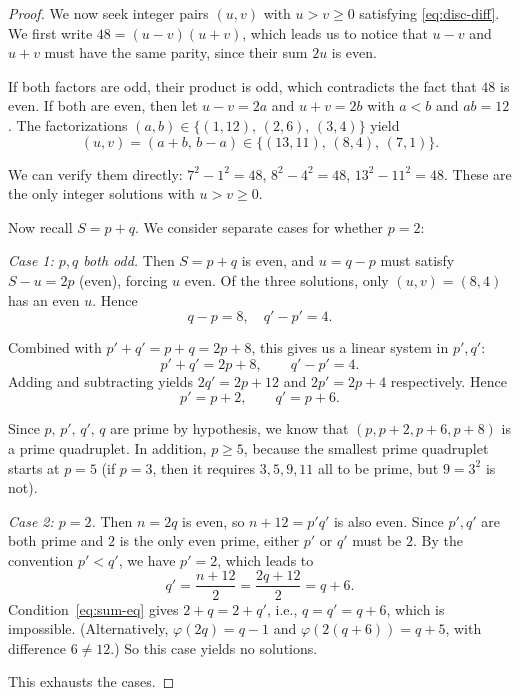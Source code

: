 \documentclass[10pt,a4paper]{amsart}
\begin{document}
\begin{proof}
We now seek integer pairs $(u, v)$ with $u > v \ge 0$ satisfying \eqref{eq:disc-diff}. We first write $48 = (u-v)(u+v)$, which leads us to notice that $u-v$ and $u+v$ must have the same parity, since their sum $2u$ is even. 

If both factors are odd, their product is odd, which contradicts the fact that $48$ is even. If both are even, then let $u - v = 2a$ and $u + v = 2b$ with $a < b$ and $ab = 12$. The factorizations $(a, b) \in \{(1, 12),\, (2, 6),\, (3, 4)\}$ yield
\[
(u, v) = (a + b,\, b - a) \in \{(13, 11),\, (8, 4),\, (7, 1)\}.
\]

We can verify them directly: $7^2 - 1^2 = 48$, $8^2 - 4^2 = 48$, $13^2 - 11^2 = 48$. These are the only integer solutions with $u > v \ge 0$.

Now recall $S = p + q$. We consider separate cases for whether $p = 2$:

\emph{Case 1: $p, q$ both odd.} Then $S = p+q$ is even, and $u = q - p$ must satisfy $S - u = 2p$ (even), forcing $u$ even. Of the three solutions, only $(u, v) = (8, 4)$ has an even $u$. Hence
\[
q - p = 8, \quad q' - p' = 4.
\]
\begin{samepage}
Combined with $p' + q' = p + q = 2p + 8$, this gives us a linear system in $p', q'$:
\[
p' + q' = 2p + 8, \qquad q' - p' = 4.
\]
Adding and subtracting yields $2q' = 2p + 12$ and $2p' = 2p + 4$ respectively. Hence
\[
p' = p + 2, \qquad q' = p + 6.
\]
\end{samepage}
Since $p, \, p', \, q', \, q$ are prime by hypothesis, we know that $(p, p+2, p+6, p+8)$ is a prime quadruplet. In addition, $p \ge 5$, because the smallest prime quadruplet starts at $p = 5$ (if $p = 3$, then it requires $3, 5, 9, 11$ all to be prime, but $9 = 3^2$ is not).

\emph{Case 2: $p = 2$.} Then $n = 2q$ is even, so $n + 12 = p'q'$ is also even. Since $p', q'$ are both prime and $2$ is the only even prime, either $p'$ or $q'$ must be $2$. By the convention $p' < q'$, we have $p' = 2$, which leads to
\[
q' = \frac{n+12}2 = \frac{2q+12}2 = q + 6.
\] 
Condition~\eqref{eq:sum-eq} gives $2 + q = 2 + q'$, i.e., $q = q' = q + 6$, which is impossible. (Alternatively, $\varphi(2q) = q - 1$ and $\varphi(2(q+6)) = q + 5$, with difference $6 \neq 12$.) So this case yields no solutions.
 
This exhausts the cases.
\end{proof}
\end{document}

